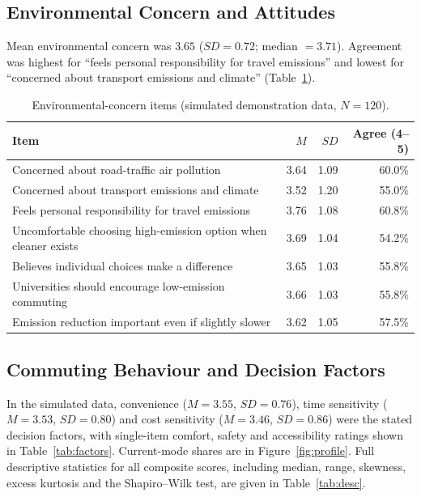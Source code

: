 \documentclass[11pt,a4paper]{article}
\begin{document}
\subsection{Environmental Concern and Attitudes}
Mean environmental concern was $3.65$ ($SD = 0.72$; median $= 3.71$). Agreement was highest for
``feels personal responsibility for travel emissions'' and lowest for ``concerned about transport
emissions and climate'' (Table~\ref{tab:concern}).

\begin{table}[H]
\centering
\small
\caption{Environmental-concern items (simulated demonstration data, $N = 120$).}
\label{tab:concern}
\begin{tabular}{@{}lrrr@{}}
\toprule
\textbf{Item} & \textbf{$M$} & \textbf{$SD$} & \textbf{Agree (4--5)}\\
\midrule
Concerned about road-traffic air pollution & 3.64 & 1.09 & 60.0\%\\
Concerned about transport emissions and climate & 3.52 & 1.20 & 55.0\%\\
Feels personal responsibility for travel emissions & 3.76 & 1.08 & 60.8\%\\
Uncomfortable choosing high-emission option when cleaner exists & 3.69 & 1.04 & 54.2\%\\
Believes individual choices make a difference & 3.65 & 1.03 & 55.8\%\\
Universities should encourage low-emission commuting & 3.66 & 1.03 & 55.8\%\\
Emission reduction important even if slightly slower & 3.62 & 1.05 & 57.5\%\\
\bottomrule
\end{tabular}
\end{table}

\subsection{Commuting Behaviour and Decision Factors}
In the simulated data, convenience ($M = 3.55$, $SD = 0.76$), time sensitivity ($M = 3.53$,
$SD = 0.80$) and cost sensitivity ($M = 3.46$, $SD = 0.86$) were the stated decision factors, with
single-item comfort, safety and accessibility ratings shown in Table~\ref{tab:factors}. Current-mode
shares are in Figure~\ref{fig:profile}. Full descriptive statistics for all composite scores,
including median, range, skewness, excess kurtosis and the Shapiro--Wilk test, are given in
Table~\ref{tab:desc}.
\end{document}
